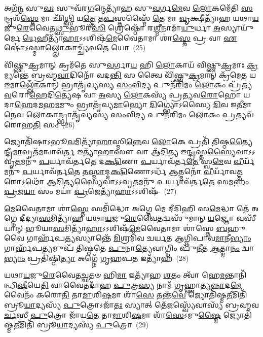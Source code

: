 {\anuvakamend[{𑌇\-\ul{𑌤𑍍𑌯𑍇}\-𑌤𑌦᳴𑌵\-\ul{𑌭𑍃}\-𑌥𑍋 𑌦𑌿𑌶𑌃᳴ \ul{𑌸}\-𑌪𑍍𑌤 𑌚᳴}]}%

𑌅𑌗᳴\-\ul{𑌨𑍍𑌮} 𑌸𑍁\-\ul{𑌵𑌃} 𑌸𑍁𑌵᳴𑌰\-\ul{𑌗}\-𑌨𑍍𑌮𑍇𑌤𑍍𑌯𑌾᳴𑌹 𑌸𑍁\-\ul{𑌵}\-𑌰𑍍𑌗\-\ul{𑌮𑍇}\-𑌵 \ul{𑌲𑍋}\-𑌕𑌮𑍇᳴𑌤𑌿 \ul{𑌸}\-𑌨𑍍𑌦𑍃𑌶᳴\-\ul{𑌸𑍍𑌤𑍇} 𑌮𑌾 𑌛𑌿᳴\-\ul{𑌥𑍍𑌸𑌿} 𑌯\-\ul{𑌤𑍍𑌤𑍇} 𑌤\-\ul{𑌪}\-𑌸𑍍𑌤𑌸𑍍𑌮𑍈᳴ \ul{𑌤𑍇} 𑌮𑌾 \ul{𑌵𑍃}\-𑌕𑍍𑌷𑍀𑌤𑍍𑌯𑌾᳴𑌹 𑌯𑌥𑌾\-\ul{𑌯}\-𑌜𑍁\-\ul{𑌰𑍇}\-𑌵𑍈𑌤\-\ul{𑌥𑍍𑌸𑍁}\-𑌭𑍂𑌰᳴\-\ul{𑌸𑌿} 𑌶𑍍𑌰𑍇𑌷𑍍𑌠𑍋᳴ 𑌰\-\ul{𑌶𑍍𑌮𑍀}\-𑌨𑌾𑌮𑌾᳴\-\ul{𑌯𑍁}\-𑌰𑍍𑌧𑌾 \ul{𑌅}\-𑌸𑍍𑌯𑌾𑌯𑍁᳴𑌰𑍍𑌮𑍇 \ul{𑌧𑍇}\-𑌹𑍀𑌤𑍍𑌯𑌾᳴\-\ul{𑌹𑌾}\-\-𑌽\-𑌽𑌶𑌿𑌷᳴\-\ul{𑌮𑍇}\-𑌵𑍈𑌤𑌾𑌮𑌾 𑌶𑌾॑\-\ul{𑌸𑍍𑌤𑍇} 𑌪𑍍𑌰 𑌵𑌾 \ul{𑌏}\-𑌷𑍋॑\-𑌽𑌸𑍍𑌮𑌾\-\ul{𑌲𑍍𑌲𑍋}\-𑌕𑌾𑌚𑍍𑌚𑍍𑌯᳴𑌵\-\ul{𑌤𑍇} 𑌯𑍋~(25)

𑌵𑌿᳴𑌷𑍍𑌣𑍁\-\ul{𑌕𑍍𑌰}\-𑌮𑌾𑌨𑍍 𑌕𑍍𑌰𑌮᳴𑌤𑍇 𑌸𑍁\-\ul{𑌵}\-𑌰𑍍𑌗𑌾\-\ul{𑌯} 𑌹𑌿 \ul{𑌲𑍋}\-𑌕𑌾𑌯᳴ 𑌵𑌿𑌷𑍍𑌣𑍁\-\ul{𑌕𑍍𑌰}\-𑌮𑌾𑌃 \ul{𑌕𑍍𑌰}\-𑌮𑍍𑌯𑌨𑍍𑌤𑍇॑ 𑌬𑍍𑌰𑌹𑍍𑌮\-\ul{𑌵𑌾}\-𑌦𑌿𑌨𑍋᳴ 𑌵𑌦\-\ul{𑌨𑍍𑌤𑌿} 𑌸 𑌤𑍍𑌵𑍈 𑌵𑌿᳴𑌷𑍍𑌣𑍁\-\ul{𑌕𑍍𑌰}\-𑌮𑌾𑌨𑍍 𑌕𑍍𑌰᳴𑌮𑍇\-\ul{𑌤} 𑌯 \ul{𑌇}\-𑌮𑌾\-\ul{𑌲𑍍𑌲𑍋𑌁}\-𑌕𑌾𑌨𑍍 𑌭𑍍𑌰𑌾𑌤𑍃᳴𑌵𑍍𑌯𑌸𑍍𑌯 \ul{𑌸𑌂}\-𑌵𑌿\-\ul{𑌦𑍍𑌯} 𑌪𑍁𑌨᳴\-\ul{𑌰𑌿}\-𑌮𑌂 \ul{𑌲𑍋}\-𑌕𑌂 𑌪𑍍𑌰᳴𑌤𑍍𑌯\-\ul{𑌵}\-𑌰𑍋\-\ul{𑌹𑍇}\-𑌦𑌿\-\ul{𑌤𑍍𑌯𑍇}\-𑌷 𑌵𑌾 \ul{𑌅}\-𑌸𑍍𑌯 \ul{𑌲𑍋}\-𑌕𑌸𑍍𑌯᳴ 𑌪𑍍𑌰𑌤𑍍𑌯𑌵\-\ul{𑌰𑍋}\-𑌹𑍋 𑌯𑌦𑌾\-\ul{𑌹𑍇}\-𑌦\-\ul{𑌮}\-𑌹\-\ul{𑌮}\-𑌮𑍁𑌂 𑌭𑍍𑌰𑌾𑌤𑍃᳴𑌵𑍍𑌯\-\ul{𑌮𑌾}\-𑌭𑍍𑌯𑍋 \ul{𑌦𑌿}\-𑌗𑍍𑌭𑍍𑌯𑍋॑\-𑌽𑌸𑍍𑌯𑍈 \ul{𑌦𑌿}\-𑌵 𑌇\-\ul{𑌤𑍀}\-𑌮𑌾\-\ul{𑌨𑍇}\-𑌵 \ul{𑌲𑍋}\-𑌕𑌾𑌨𑍍𑌭𑍍𑌰𑌾𑌤𑍃᳴𑌵𑍍𑌯𑌸𑍍𑌯 \ul{𑌸𑌂}\-𑌵𑌿\-\ul{𑌦𑍍𑌯} 𑌪𑍁𑌨᳴\-\ul{𑌰𑌿}\-𑌮𑌂 \ul{𑌲𑍋}\-𑌕𑌂 \ul{𑌪𑍍𑌰}\-𑌤𑍍𑌯𑌵᳴𑌰𑍋𑌹\-\ul{𑌤𑌿} 𑌸𑌂~(26)

𑌜𑍍𑌯𑍋𑌤𑌿᳴𑌷𑌾\-𑌽𑌭𑍂\-\ul{𑌵}\-𑌮𑌿𑌤𑍍𑌯𑌾᳴\-\ul{𑌹𑌾}\-𑌸𑍍𑌮𑌿\-\ul{𑌨𑍍𑌨𑍇}\-𑌵 \ul{𑌲𑍋}\-𑌕𑍇 𑌪𑍍𑌰𑌤𑌿᳴ 𑌤𑌿𑌷𑍍𑌠\-\ul{𑌤𑍍𑌯𑍈}\-𑌨𑍍𑌦𑍍𑌰𑍀\-\ul{𑌮𑌾}\-\-𑌵𑍃𑌤᳴\-\ul{𑌮}\-𑌨𑍍𑌵𑌾𑌵᳴\-\ul{𑌰𑍍𑌤} 𑌇𑌤𑍍𑌯𑌾᳴\-\ul{𑌹𑌾}\-𑌸𑍗 𑌵𑌾 𑌆᳴\-\ul{𑌦𑌿}\-𑌤𑍍𑌯 𑌇\-\ul{𑌨𑍍𑌦𑍍𑌰}\-𑌸𑍍𑌤\-\ul{𑌸𑍍𑌯𑍈}\-𑌵𑌾\-𑌽\-𑌽\-𑌵𑍃\-\ul{𑌤}\-𑌮𑌨𑍁᳴ \ul{𑌪}\-𑌰𑍍𑌯𑌾𑌵᳴𑌰𑍍𑌤𑌤𑍇 𑌦\-\ul{𑌕𑍍𑌷𑌿}\-𑌣𑌾 \ul{𑌪}\-𑌰𑍍𑌯𑌾𑌵᳴𑌰𑍍𑌤\-\ul{𑌤𑍇} 𑌸𑍍𑌵\-\ul{𑌮𑍇}\-𑌵 \ul{𑌵𑍀}\-𑌰𑍍𑌯᳴𑌮𑌨𑍁᳴ \ul{𑌪}\-𑌰𑍍𑌯𑌾𑌵᳴𑌰𑍍𑌤\-\ul{𑌤𑍇} 𑌤\-\ul{𑌸𑍍𑌮𑌾}\-𑌦𑍍𑌦\-\ul{𑌕𑍍𑌷𑌿}\-𑌣𑍋\-𑌽𑌰𑍍𑌧᳴ \ul{𑌆}\-𑌤𑍍𑌮𑌨𑍋᳴ \ul{𑌵𑍀}\-𑌰𑍍𑌯𑌾᳴𑌵\-\ul{𑌤𑍍𑌤}\-𑌰𑍋\-𑌽𑌥𑍋᳴ 𑌆\-\ul{𑌦𑌿}\-𑌤𑍍𑌯\-\ul{𑌸𑍍𑌯𑍈}\-𑌵𑌾\-𑌽\-𑌽𑌵𑍃\-\ul{𑌤}\-𑌮𑌨𑍁᳴ \ul{𑌪}\-𑌰𑍍𑌯𑌾𑌵᳴𑌰𑍍𑌤\-\ul{𑌤𑍇} 𑌸\-\ul{𑌮}\-𑌹𑌂 \ul{𑌪𑍍𑌰}\-𑌜\-\ul{𑌯𑌾} 𑌸𑌂 𑌮𑌯𑌾॑ \ul{𑌪𑍍𑌰}\-𑌜𑍇𑌤𑍍𑌯𑌾᳴\-\ul{𑌹𑌾}\-\-𑌽\-𑌽𑌶𑌿𑌷᳴-~(27)

\-\ul{𑌮𑍇}\-𑌵𑍈𑌤𑌾𑌮𑌾 𑌶𑌾॑\-\ul{𑌸𑍍𑌤𑍇} 𑌸𑌮𑌿᳴𑌦𑍍𑌧𑍋 𑌅𑌗𑍍𑌨𑍇 𑌮𑍇 𑌦𑍀𑌦𑌿𑌹𑌿 𑌸\-\ul{𑌮𑍇}\-𑌦𑍍𑌧𑌾 𑌤𑍇᳴ 𑌅𑌗𑍍𑌨𑍇 𑌦𑍀𑌦𑍍𑌯𑌾\-\ul{𑌸}\-𑌮𑌿𑌤𑍍𑌯𑌾᳴𑌹 𑌯𑌥𑌾\-\ul{𑌯}\-𑌜𑍁\-\ul{𑌰𑍇}\-𑌵𑍈𑌤𑌦𑍍𑌵𑌸𑍁᳴𑌮𑌾𑌨𑍍 \ul{𑌯}\-𑌜𑍍𑌞𑍋 𑌵𑌸𑍀᳴𑌯𑌾𑌨𑍍 𑌭𑍂𑌯𑌾\-\ul{𑌸}\-𑌮𑌿𑌤𑍍𑌯𑌾᳴\-\ul{𑌹𑌾}\-\-𑌽\-𑌽𑌶𑌿𑌷᳴\-\ul{𑌮𑍇}\-𑌵𑍈𑌤𑌾𑌮𑌾 𑌶𑌾॑𑌸𑍍𑌤𑍇 \ul{𑌬}\-𑌹𑍁 𑌵𑍈 𑌗𑌾𑌰𑍍\mbox{}𑌹᳴𑌪\-\ul{𑌤𑍍𑌯}\-𑌸𑍍𑌯𑌾𑌨𑍍𑌤𑍇᳴ \ul{𑌮𑌿}\-𑌶𑍍𑌰𑌮𑌿᳴𑌵 𑌚𑌰𑍍𑌯𑌤 𑌆𑌗𑍍𑌨𑌿𑌪𑌾𑌵\-\ul{𑌮𑌾}\-𑌨𑍀\-\ul{𑌭𑍍𑌯𑌾𑌂} 𑌗𑌾𑌰𑍍\mbox{}𑌹᳴𑌪\-\ul{𑌤𑍍𑌯}\-𑌮𑍁𑌪᳴ 𑌤𑌿𑌷𑍍𑌠𑌤𑍇 \ul{𑌪𑍁}\-𑌨𑌾\-\ul{𑌤𑍍𑌯𑍇}\-𑌵𑌾𑌗𑍍𑌨𑌿𑌂 𑌪𑍁᳴\-\ul{𑌨𑍀}\-𑌤 \ul{𑌆}\-𑌤𑍍𑌮𑌾\-\ul{𑌨𑌂} 𑌦𑍍𑌵𑌾\-\ul{𑌭𑍍𑌯𑌾𑌂} 𑌪𑍍𑌰𑌤𑌿᳴𑌷𑍍𑌠𑌿\-\ul{𑌤𑍍𑌯𑌾} 𑌅𑌗𑍍𑌨𑍇᳴ 𑌗𑍃𑌹𑌪\-\ul{𑌤} 𑌇𑌤𑍍𑌯𑌾᳴𑌹~(28)

𑌯𑌥𑌾\-\ul{𑌯}\-𑌜𑍁\-\ul{𑌰𑍇}\-𑌵𑍈𑌤\-\ul{𑌚𑍍𑌛}\-𑌤𑍞 𑌹𑌿\-\ul{𑌮𑌾} 𑌇𑌤𑍍𑌯𑌾᳴𑌹 \ul{𑌶}\-𑌤𑌂 𑌤𑍍𑌵𑌾᳴ 𑌹𑍇\-\ul{𑌮}\-𑌨𑍍𑌤𑌾𑌨𑌿᳴𑌨𑍍𑌧𑌿\-\ul{𑌷𑍀}\-𑌯𑍇\-\ul{𑌤𑌿} 𑌵𑌾𑌵𑍈𑌤𑌦𑌾᳴𑌹 \ul{𑌪𑍁}\-𑌤𑍍𑌰\-\ul{𑌸𑍍𑌯} 𑌨𑌾𑌮᳴ 𑌗𑍃𑌹𑍍𑌣𑌾𑌤𑍍𑌯\-\ul{𑌨𑍍𑌨𑌾}\-𑌦\-\ul{𑌮𑍇}\-𑌵𑍈𑌨𑌂᳴ 𑌕𑌰𑍋\-\ul{𑌤𑌿} 𑌤𑌾\-\ul{𑌮𑌾}\-𑌶𑌿\-\ul{𑌷}\-𑌮𑌾 𑌶𑌾᳴\-\ul{𑌸𑍇} 𑌤𑌨𑍍𑌤᳴\-\ul{𑌵𑍇} 𑌜𑍍𑌯𑍋𑌤𑌿᳴𑌷𑍍𑌮\-\ul{𑌤𑍀}\-𑌮𑌿𑌤𑌿᳴ 𑌬𑍍𑌰𑍂\-\ul{𑌯𑌾}\-𑌦𑍍𑌯𑌸𑍍𑌯᳴ \ul{𑌪𑍁}\-𑌤𑍍𑌰𑍋\-𑌽𑌜𑌾᳴\-\ul{𑌤𑌃} 𑌸𑍍𑌯𑌾𑌤𑍍 𑌤𑍇᳴\-\ul{𑌜}\-𑌸𑍍𑌵𑍍𑌯𑍇᳴𑌵𑌾𑌸𑍍𑌯᳴ 𑌬𑍍𑌰𑌹𑍍𑌮𑌵\-\ul{𑌰𑍍𑌚}\-𑌸𑍀 \ul{𑌪𑍁}\-𑌤𑍍𑌰𑍋 𑌜𑌾᳴𑌯\-\ul{𑌤𑍇} 𑌤𑌾\-\ul{𑌮𑌾}\-𑌶𑌿\-\ul{𑌷}\-𑌮𑌾 𑌶𑌾᳴\-\ul{𑌸𑍇}\-\-𑌽𑌮𑍁\-\ul{𑌷𑍍𑌮𑍈} 𑌜𑍍𑌯𑍋𑌤𑌿᳴𑌷𑍍𑌮\-\ul{𑌤𑍀}\-𑌮𑌿𑌤𑌿᳴ 𑌬𑍍𑌰𑍂\-\ul{𑌯𑌾}\-𑌦𑍍𑌯𑌸𑍍𑌯᳴ \ul{𑌪𑍁}\-𑌤𑍍𑌰𑍋~(29)

